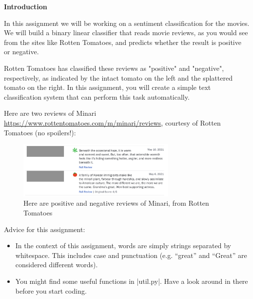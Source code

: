 {\bf Introduction}

In this assignment we will be working on a sentiment classification for the movies. We will build a binary linear classifier that reads movie reviews, as you would see from the sites like Rotten Tomatoes, and predicts whether the result is positive or negative.

Rotten Tomatoes has classified these reviews as "positive" and "negative", respectively, as indicated by the intact tomato on the left and the splattered tomato on the right. In this assignment, you will create a simple text classification system that can perform this task automatically.

Here are two reviews of Minari \url{https://www.rottentomatoes.com/m/minari/reviews}, courtesy of Rotten Tomatoes (no spoilers!):


\begin{figure}[h]
    \begin{center}
        \captionsetup{width=0.8\textwidth}
        \includegraphics[width=0.7\textwidth]{images/minari.png}
        \caption{Here are positive and negative reviews of Minari, from Rotten Tomatoes}
        \label{rotton_tomatoespos}
    \end{center}
\end{figure}


Advice for this assignment:
\begin{itemize}
  \item In the context of this assignment, words are simply strings separated
  by whitespace. This includes case and punctuation (e.g. ``great'' and
  ``Great'' are considered different words).
  \item You might find some useful functions in |util.py|.  Have a look
  around in there before you start coding.
\end{itemize}
